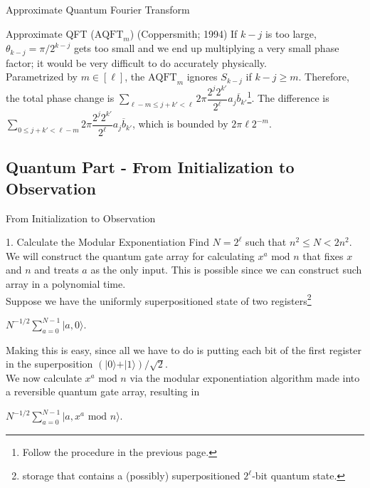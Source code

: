 \documentclass{beamer}
\newcommand{\mrm}[1]{\mathrm{#1}}
\renewcommand{\:}{\text{ }}
\renewcommand{\mod}{\text{ mod }}
\begin{document}
    \begin{frame}{Approximate Quantum Fourier Transform}
        \begin{block}{Approximate QFT ($\mrm{AQFT}_m$) (Coppersmith; 1994) \href{https://arxiv.org/abs/quant-ph/0201067}{}}
            If $k-j$ is too large, $\theta_{k-j} = \pi / 2^{k-j}$ gets too small and we end up multiplying a very small phase factor;
            it would be very difficult to do accurately physically.\\[.5em]
            Parametrized by $m \in [\ell]$, the $\mrm{AQFT}_m$ ignores $S_{k-j}$ if $k-j \geq m$.
            Therefore, the total phase change is
            $\sum_{\ell-m \leq j+k' < \ell} 2\pi \dfrac{2^j 2^{k'}}{2^\ell} a_j \overline{b}_{k'}$\footnote{Follow the procedure in the previous page.}.
            The difference is $\sum_{0 \leq j+k' < \ell-m} 2\pi \dfrac{2^j 2^{k'}}{2^\ell} a_j \overline{b}_{k'}$,
            which is bounded by $2\pi \ell 2^{-m}$.
        \end{block}
    \end{frame}

    \subsection{Quantum Part - From Initialization to Observation}
    \begin{frame}{From Initialization to Observation}
        \begin{block}{1. Calculate the Modular Exponentiation}
            \small
            Find $N=2^\ell$ such that $n^2 \leq N < 2n^2$. \\[.5em]
            We will construct the quantum gate array for calculating $x^a \mod n$
            that fixes $x$ and $n$ and treats $a$ as the only input.
            This is possible since we can construct such array in a polynomial time.\\[.5em]
            Suppose we have the uniformly superpositioned state of two registers\footnote{storage that contains a (possibly) superpositioned $2^\ell$-bit quantum state.}\\[.5em]
            \centerline{$N^{-1/2}\sum_{a=0}^{N-1} \vert a, 0 \rangle$.}\vspace*{.5em}
            Making this is easy, since all we have to do is putting each bit of the first register in the superposition $(\vert 0 \rangle + \vert 1 \rangle)/\sqrt{2}$. \\[.5em]
            We now calculate $x^a \mod n$ via the modular exponentiation algorithm made into a reversible quantum gate array, resulting in \\[.5em]
            \centerline{$N^{-1/2}\sum_{a=0}^{N-1} \vert a, x^a \mod n \rangle$.}
        \end{block}
    \end{frame}
\end{document}
